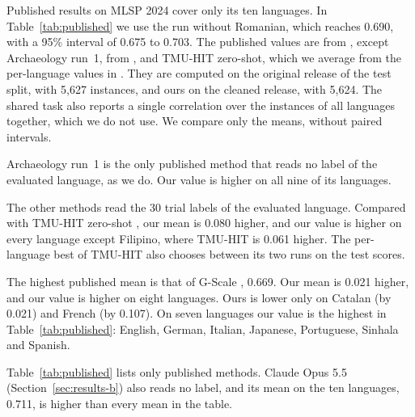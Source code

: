 Published results on MLSP 2024 cover only its ten languages. In Table~\ref{tab:published} we use
the run without Romanian, which reaches 0.690, with a 95\% interval of 0.675 to 0.703. The %
published values are from \citet{nohejl-etal-2025-japanese}, except Archaeology run~1, from
\citet{cristea-nisioi-2024-machine}, and TMU-HIT zero-shot, which we average from the per-language
values in \citet{shardlow-etal-2024-bea}. They are computed on the original release of the test %
split, with 5{,}627 instances, and ours on the cleaned release, with 5{,}624. The shared task also
reports a single correlation over the instances of all languages together, which we do not use.
We compare only the means, without paired intervals. %

Archaeology run~1 is the only published method that reads no label of the evaluated language, as
we do. Our value is higher on all nine of its languages.

The other methods read the 30 trial labels of the evaluated language. Compared with TMU-HIT
zero-shot \citep{enomoto-etal-2024-tmu}, our mean is 0.080 higher, and our value is higher on every %
language except Filipino, where TMU-HIT is 0.061 higher. The per-language best of TMU-HIT also %
chooses between its two runs on the test scores. %

The highest published mean is that of G-Scale \citep{nohejl-etal-2025-japanese}, 0.669. Our mean
is 0.021 higher, and our value is higher on eight languages. Ours is lower only on Catalan (by %
0.021) and French (by 0.107). On seven languages our value is the highest in %
Table~\ref{tab:published}: English, German, Italian, Japanese, Portuguese, Sinhala and Spanish.

Table~\ref{tab:published} lists only published methods. Claude Opus 5.5 (Section~\ref{sec:results-b}) %
also reads no label, and its mean on the ten languages, 0.711, is higher than every mean in the
table.

